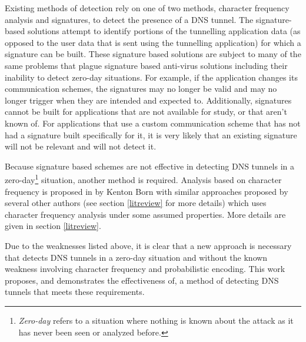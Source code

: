 \documentclass[12pt]{report}
\theoremstyle{remark}
\theoremstyle{definition}
\theoremstyle{definition}
\theoremstyle{definition}
\begin{document}
Existing methods of detection rely on one of two methods, character frequency
analysis
and signatures, to detect the presence of a DNS tunnel. The signature-based
solutions attempt to identify portions of the tunnelling
application data (as opposed to the user data that is sent using the tunnelling
application) for which a signature can be built. These signature based
solutions are subject to many of the same problems that plague signature based
anti-virus solutions including their inability to detect zero-day situations.
 For example, if the application changes its communication
schemes, the signatures may no longer be valid and may no longer trigger when
they are intended and expected to. Additionally, signatures cannot be built for
applications
that are not available for study, or that aren't known of. For applications
that use a custom communication scheme that has not had a signature built
specifically for it, it is very likely that an existing signature will not be
relevant and will not detect it.

Because signature based schemes are not effective in detecting DNS tunnels in a
zero-day\footnote{\emph{Zero-day} refers to a situation where nothing is
known about the attack as it has never been seen or analyzed before.} situation,
another
method is required. Analysis based on character frequency is proposed
in\cite{Born2010.cfa} by Kenton Born with similar approaches proposed by several
other authors (see section \ref{litreview} for more details) which uses
character
frequency analysis under some assumed properties. More details are given in section
\ref{litreview}.


Due to the weaknesses listed above, it is clear that a new approach is
necessary that detects DNS tunnels in a zero-day situation and without the known
weakness involving character frequency and probabilistic encoding. This work
proposes, and demonstrates the effectiveness of, a method of detecting DNS
tunnels that meets these requirements.
\end{document}
